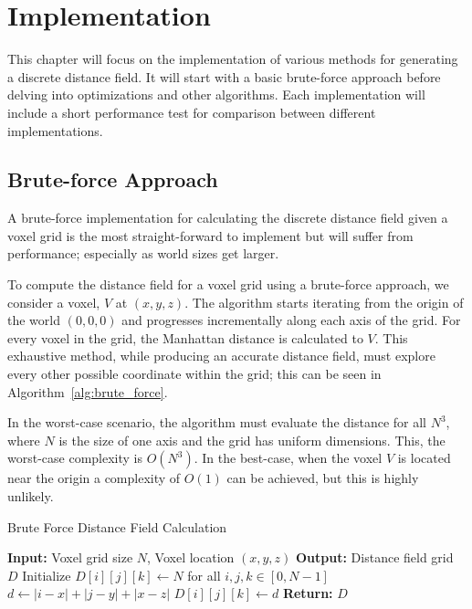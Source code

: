 \chapter{Implementation}
This chapter will focus on the implementation of various methods for generating a discrete distance field. It will start
with a basic brute-force approach before delving into optimizations and other algorithms. Each implementation will
include a short performance test for comparison between different implementations.

\section{Brute-force Approach}
A brute-force implementation for calculating the discrete distance field given a voxel grid is the most straight-forward
to implement but will suffer from performance; especially as world sizes get larger.

To compute the distance field for a voxel grid using a brute-force approach, we consider a voxel, \(V\) at \((x, y, z)\). The
algorithm starts iterating from the origin of the world \((0, 0, 0)\) and progresses incrementally along each axis of
the grid. For every voxel in the grid, the Manhattan distance is calculated to \(V\). This exhaustive method, while
producing an accurate distance field, must explore every other possible coordinate within the grid; this can be seen in
Algorithm~\ref{alg:brute_force}.

In the worst-case scenario, the algorithm must evaluate the distance for all \(N^3\), where \(N\) is the size of one
axis and the grid has uniform dimensions. This, the worst-case complexity is \(O(N^3)\). In the best-case, when the
voxel \(V\) is located near the origin a complexity of \(O(1)\) can be achieved, but this is highly unlikely.

\begin{algorithm}
    \caption{Brute Force Distance Field Calculation}
    \label{alg:brute_force}
    \begin{algorithmic}[1]
        \STATE \textbf{Input:} Voxel grid size \(N\), Voxel location \((x, y, z)\)
        \STATE \textbf{Output:} Distance field grid \(D\)
        \STATE Initialize \(D[i][j][k] \gets N\) for all \(i, j, k \in [0, N-1]\)
        \STATE \(d \gets |i - x| + |j - y| + |x - z|\) 
        \STATE \(D[i][j][k] \gets d\) 
        \ENDIF
        \ENDFOR
        \ENDFOR
        \ENDFOR
        \STATE \textbf{Return:} \(D\)
    \end{algorithmic}
\end{algorithm}


